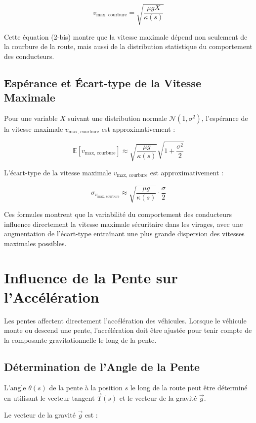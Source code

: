 \documentclass[a4paper,12pt]{article}
\begin{document}
\[
v_{\text{max, courbure}} = \sqrt{\frac{\mu g X}{\kappa(s)}} \tag{2-bis}
\]

Cette équation (2-bis) montre que la vitesse maximale dépend non seulement de la courbure de la route, mais aussi de la distribution statistique du comportement des conducteurs.

\subsection{Espérance et Écart-type de la Vitesse Maximale}

Pour une variable \( X \) suivant une distribution normale \( \mathcal{N}(1, \sigma^2) \), l'espérance de la vitesse maximale \( v_{\text{max, courbure}} \) est approximativement :

\[
\mathbb{E}[v_{\text{max, courbure}}] \approx \sqrt{\frac{\mu g}{\kappa(s)}} \sqrt{1 + \frac{\sigma^2}{2}}
\]

L'écart-type de la vitesse maximale \( v_{\text{max, courbure}} \) est approximativement :

\[
\sigma_{v_{\text{max, courbure}}} \approx \sqrt{\frac{\mu g}{\kappa(s)}} \cdot \frac{\sigma}{2}
\]

Ces formules montrent que la variabilité du comportement des conducteurs influence directement la vitesse maximale sécuritaire dans les virages, avec une augmentation de l'écart-type entraînant une plus grande dispersion des vitesses maximales possibles.

\section{Influence de la Pente sur l'Accélération}

Les pentes affectent directement l'accélération des véhicules. Lorsque le véhicule monte ou descend une pente, l'accélération doit être ajustée pour tenir compte de la composante gravitationnelle le long de la pente.

\subsection{Détermination de l'Angle de la Pente}

L'angle \(\theta(s)\) de la pente à la position \(s\) le long de la route peut être déterminé en utilisant le vecteur tangent \(\vec{T}(s)\) et le vecteur de la gravité \(\vec{g}\).

Le vecteur de la gravité \(\vec{g}\) est :
\end{document}
